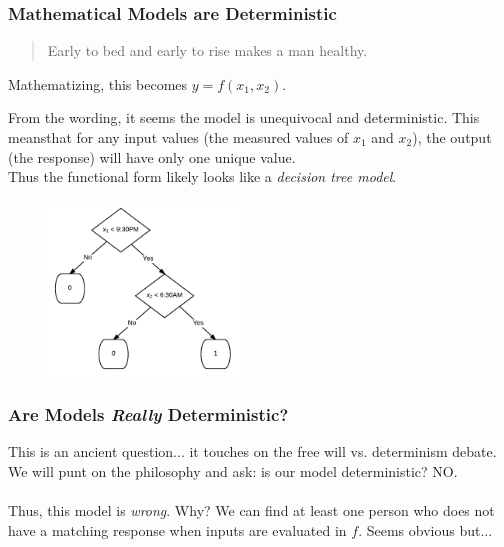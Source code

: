 \documentclass[handout]{beamer}
\begin{document}
\begin{frame}\frametitle{Mathematical Models are Deterministic}

\small
\begin{quotation}
Early to bed and early to rise makes a man healthy.
\end{quotation}

Mathematizing, this becomes $y = f(x_1, x_2)$.\\

\begin{minipage}{0.4\textwidth}
\footnotesize
From the wording, it seems the model is unequivocal and deterministic. This meansthat for any input values (the measured values of $x_1$ and $x_2$), the output (the response) will have only one unique value.\\  \pause 
\vspace{0.2cm}
Thus the functional form likely looks like a \textit{decision tree model}.
\end{minipage}%
\begin{minipage}{0.6\textwidth}
\begin{figure}
\centering
\includegraphics[width=2in]{simple_health}
\end{figure}
\end{minipage}
	
\end{frame}

\begin{frame}\frametitle{Are Models \textit{Really} Deterministic?}

This is an ancient question... it touches on the free will vs. determinism debate.  \pause We will punt on the philosophy and ask: is our model deterministic? \pause NO. \\~\\

Thus, this model is \emph{wrong}. Why?  \pause We can find at least one person who does not have a matching response when inputs are evaluated in $f$. Seems obvious but...

\end{frame}
\end{document}
